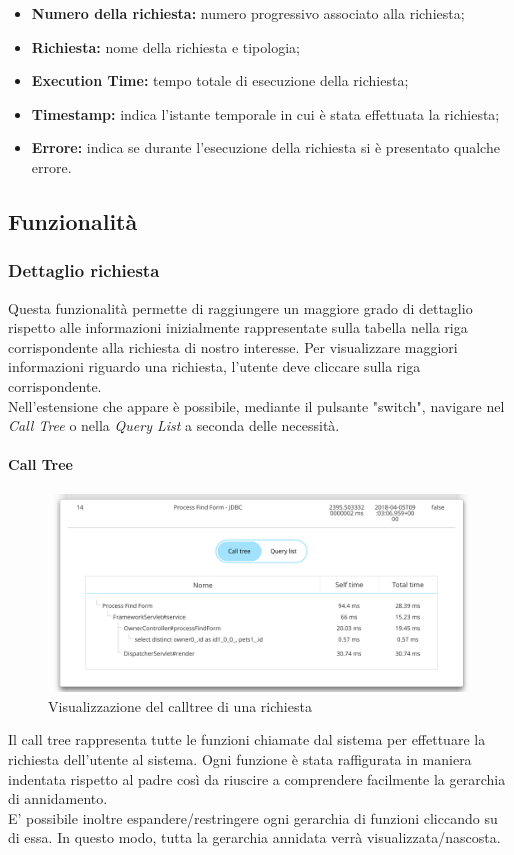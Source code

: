     \begin{itemize}
    	
    	\item \textbf{Numero della richiesta:} numero progressivo associato alla richiesta;
    	\item \textbf{Richiesta:} nome della richiesta e tipologia;
    	\item \textbf{Execution Time:} tempo totale di esecuzione della richiesta;
    	\item \textbf{Timestamp:} indica l'istante temporale in cui è stata effettuata la richiesta;
    	\item \textbf{Errore:} indica se durante l'esecuzione della richiesta si è presentato qualche errore.
    	
    	\end{itemize}

\subsection{Funzionalità}
\subsubsection {Dettaglio richiesta}
Questa funzionalità permette di raggiungere un maggiore grado di dettaglio rispetto alle informazioni inizialmente rappresentate sulla tabella nella riga corrispondente alla richiesta di nostro interesse.
Per visualizzare maggiori informazioni riguardo una richiesta, l'utente deve cliccare sulla riga corrispondente.
\\Nell'estensione che appare è possibile, mediante il pulsante "switch", navigare nel \emph{Call Tree} o nella \emph{Query List} a seconda delle necessità.

\paragraph {Call Tree} \Spazio
\begin{figure}[H]
	\centering 
	\includegraphics[width=1\textwidth]{Images/calltree}
	\caption{Visualizzazione del calltree di una richiesta}
\end{figure}
Il call tree rappresenta tutte le funzioni chiamate dal sistema per effettuare la richiesta dell'utente al sistema.
Ogni funzione è stata raffigurata in maniera indentata rispetto al padre così da riuscire a comprendere facilmente la gerarchia di annidamento.\\
E' possibile inoltre espandere/restringere ogni gerarchia di funzioni cliccando su di essa. In questo modo, tutta la gerarchia annidata verrà visualizzata/nascosta.

